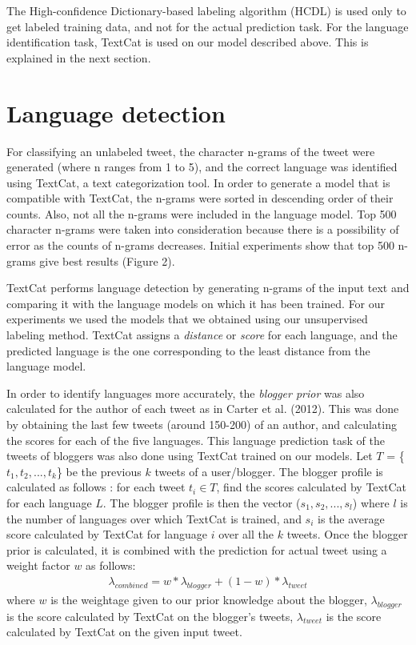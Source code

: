 \documentclass[11pt]{article}
\begin{document}
The High-confidence Dictionary-based labeling algorithm (HCDL) is used only to get labeled training data, and not for the actual prediction task. For the language identification task, TextCat is used on our model described above. This is explained in the next section.

\section{Language detection}
For classifying an unlabeled tweet, the character n-grams of the tweet were generated (where n ranges from 1 to 5), and the correct language was identified using TextCat, a text categorization tool. In order to generate a model that is compatible with TextCat, the n-grams were sorted in descending order of their counts. Also, not all the n-grams were included in the language model. Top 500 character n-grams were taken into consideration because there is a possibility of error as the counts of n-grams decreases. Initial experiments show that top 500 n-grams give best results (Figure 2).

TextCat performs language detection by generating n-grams of the input text and comparing it with the language models on which it has been trained. For our experiments we used the models that we obtained using our unsupervised labeling method. TextCat assigns a {\em distance} or {\em score} for each language, and the predicted language is the one corresponding to the least distance from the language model.

In order to identify languages more accurately, the {\em blogger prior} was also calculated for the author of each tweet as in Carter et al. (2012). This was done by obtaining the last few tweets (around 150-200) of an author, and calculating the scores for each of the five languages. This language prediction task of the tweets of bloggers was also done using TextCat trained on our models. Let $T$ = \{ $t_1, t_2, ..., t_k$\} be the previous $k$ tweets of a user/blogger. The blogger profile is calculated as follows : for each tweet $t_i \in T$, find the scores calculated by TextCat for each language $L$. The blogger profile is then the vector ($s_1, s_2, ..., s_l$) where $l$ is the number of languages over which TextCat is trained, and $s_i$ is the average score calculated by TextCat for language $i$ over all the $k$ tweets.
Once the blogger prior is calculated, it is combined with the prediction for actual tweet using a weight factor $w$ as follows: \\
\begin{eqnarray}
{\lambda}_{combined} = w * {\lambda}_{blogger} + (1 - w) * {\lambda}_{tweet} 
\end{eqnarray}
where $w$ is the weightage given to our prior knowledge about the blogger, ${\lambda}_{blogger}$ is the score calculated by TextCat on the blogger's tweets, ${\lambda}_{tweet}$ is the score calculated by TextCat on the given input tweet.
\end{document}
